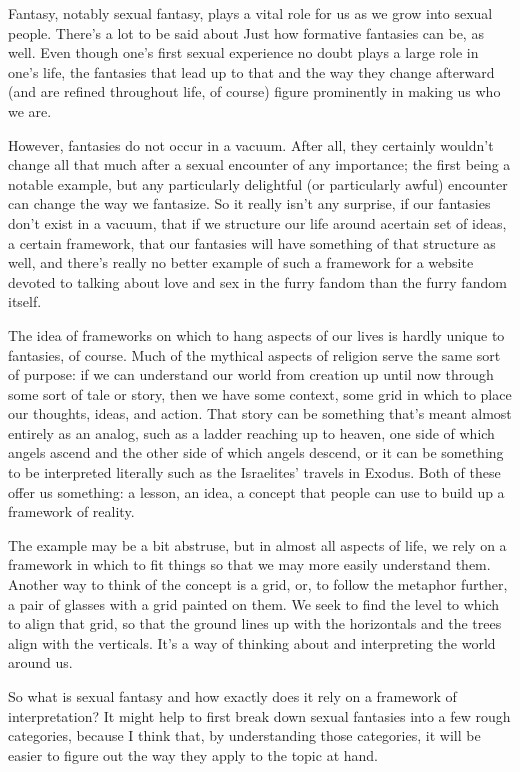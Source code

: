 
Fantasy, notably sexual fantasy, plays a vital role for us as we grow into sexual people. There's a lot to be said about Just how formative fantasies can be, as well. Even though one's first sexual experience no doubt plays a large role in one's life, the fantasies that lead up to that and the way they change afterward (and are refined throughout life, of course) figure prominently in making us who we are.

However, fantasies do not occur in a vacuum. After all, they certainly wouldn't change all that much after a sexual encounter of any importance; the first being a notable example, but any particularly delightful (or particularly awful) encounter can change the way we fantasize. So it really isn't any surprise, if our fantasies don't exist in a vacuum, that if we structure our life around acertain set of ideas, a certain framework, that our fantasies will have something of that structure as well, and there's really no better example of such a framework for a website devoted to talking about love and sex in the furry fandom than the furry fandom itself.

The idea of frameworks on which to hang aspects of our lives is hardly unique to fantasies, of course. Much of the mythical aspects of religion serve the same sort of purpose: if we can understand our world from creation up until now through some sort of tale or story, then we have some context, some grid in which to place our thoughts, ideas, and action. That story can be something that's meant almost entirely as an analog, such as a ladder reaching up to heaven, one side of which angels ascend and the other side of which angels descend, or it can be something to be interpreted literally such as the Israelites' travels in Exodus. Both of these offer us something: a lesson, an idea, a concept that people can use to build up a framework of reality.

The example may be a bit abstruse, but in almost all aspects of life, we rely on a framework in which to fit things so that we may more easily understand them. Another way to think of the concept is a grid, or, to follow the metaphor further, a pair of glasses with a grid painted on them. We seek to find the level to which to align that grid, so that the ground lines up with the horizontals and the trees align with the verticals. It's a way of thinking about and interpreting the world around us.

So what is sexual fantasy and how exactly does it rely on a framework of interpretation? It might help to first break down sexual fantasies into a few rough categories, because I think that, by understanding those categories, it will be easier to figure out the way they apply to the topic at hand.


